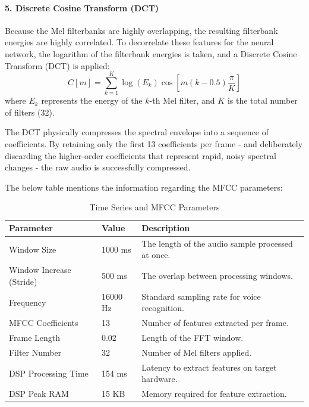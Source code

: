 \documentclass[11pt,a4paper,openany]{book}
\begin{document}
\paragraph{5. Discrete Cosine Transform (DCT)}
Because the Mel filterbanks are highly overlapping, the resulting filterbank energies are highly correlated. To decorrelate these features for the neural network, the logarithm of the filterbank energies is taken, and a Discrete Cosine Transform (DCT) is applied:
\begin{equation}
C[m] = \sum_{k=1}^{K} \log(E_k) \cos\left[m \left(k - 0.5\right) \frac{\pi}{K}\right]
\end{equation}
where $E_k$ represents the energy of the $k$-th Mel filter, and $K$ is the total number of filters (32).

The DCT physically compresses the spectral envelope into a sequence of coefficients. By retaining only the first 13 coefficients per frame - and deliberately discarding the higher-order coefficients that represent rapid, noisy spectral changes - the raw audio is successfully compressed. 

The below table mentions the information regarding the MFCC parameters:

\vspace{1em}

\begin{table}[!ht]
\centering
\caption{Time Series and MFCC Parameters}
\label{tab:mfcc_params}
\renewcommand{\arraystretch}{1.3} 
\begin{tabular}{|l|l|p{7.5cm}|}
\hline
\textbf{Parameter} & \textbf{Value} & \textbf{Description} \\ \hline
Window Size & 1000 ms & The length of the audio sample processed at once. \\ \hline
Window Increase (Stride) & 500 ms & The overlap between processing windows. \\ \hline
Frequency & 16000 Hz & Standard sampling rate for voice recognition. \\ \hline
MFCC Coefficients & 13 & Number of features extracted per frame. \\ \hline
Frame Length & 0.02 & Length of the FFT window. \\ \hline
Filter Number & 32 & Number of Mel filters applied. \\ \hline
DSP Processing Time & 154 ms & Latency to extract features on target hardware. \\ \hline
DSP Peak RAM & 15 KB & Memory required for feature extraction. \\ \hline
\end{tabular}
\end{table}
\end{document}
